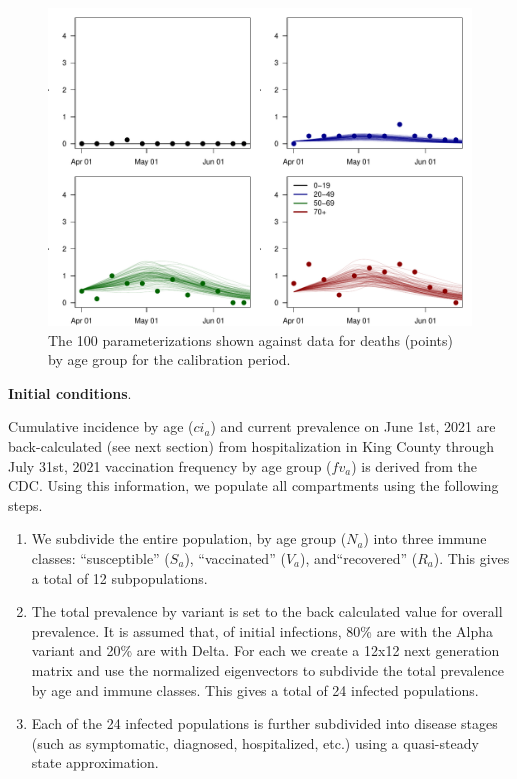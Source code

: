 \documentclass[11pt]{article}
\begin{document}
\begin{figure}[tbp]
\centering
\includegraphics[width=\textwidth]{params_calib_death}
\caption{The 100 parameterizations shown against data for deaths (points) by age group for the calibration period.}
\label{fig:calib_deaths}
\end{figure}

{\bf Initial conditions}. 

Cumulative incidence by age ($ci_a$) and current prevalence on June 1st, 2021 are back-calculated (see next section) from hospitalization in King County through July 31st, 2021 vaccination frequency by age group ($fv_a$) is derived from the CDC. Using this information, we populate all compartments using the following steps. 

\begin{enumerate}
  \item We subdivide the entire population, by age group ($N_a$) into three immune classes: ``susceptible'' ($S_a$), ``vaccinated'' ($V_a$), and``recovered'' ($R_a$). This gives a total of 12 subpopulations.
  \item The total prevalence by variant is set to the back calculated value for overall prevalence. It is assumed that, of initial infections, 80\% are with the Alpha variant and 20\% are with Delta. For each we create a 12x12 next generation matrix and use the normalized eigenvectors to subdivide the total prevalence by age and immune classes. This gives a total of 24 infected populations. 
  \item Each of the 24 infected populations is further subdivided into disease stages (such as symptomatic, diagnosed, hospitalized, etc.) using a quasi-steady state approximation. 
\end{enumerate}
\end{document}
